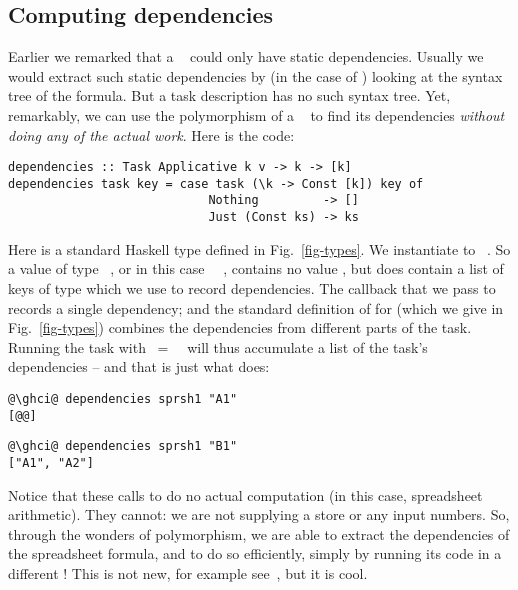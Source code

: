 \subsection{Computing dependencies}\label{sec-deps}

Earlier we remarked that a ~ could only have static
dependencies. Usually we would extract such static dependencies by (in the case
of \Excel) looking at the syntax tree of the formula.  But a task description
has no such syntax tree. Yet, remarkably, we can use the polymorphism of a
~ to find its dependencies \emph{without doing any of
the actual work}. Here is the code:
\vspace{1mm}
\begin{verbatim}
dependencies :: Task Applicative k v -> k -> [k]
dependencies task key = case task (\k -> Const [k]) key of
                            Nothing         -> []
                            Just (Const ks) -> ks
\end{verbatim}
\vspace{1mm}
Here  is a standard Haskell type defined in Fig.~\ref{fig-types}. We
instantiate  to ~\hs{[@@k]}.  So a value of type ~,
or in this case ~\hs{[@@k]}~, contains no value , but does
contain a list of keys of type \hs{[@@k]} which we use to record dependencies.
The  callback that we pass to  records a single dependency;
and the standard definition of  for  (which we give
in Fig.~\ref{fig-types}) combines the dependencies from different parts of the
task. Running the task with ~=~~\hs{[@@k]} will thus
accumulate a list of the task's dependencies -- and that is just what
 does:
\vspace{1mm}
\begin{verbatim}
@\ghci@ dependencies sprsh1 "A1"
[@@]
\end{verbatim}
\begin{verbatim}
@\ghci@ dependencies sprsh1 "B1"
["A1", "A2"]
\end{verbatim}
\vspace{1mm}

\noindent
Notice that these calls to  do no actual computation (in this
case, spreadsheet arithmetic). They cannot: we are not supplying a store or any
input numbers. So, through the wonders of polymorphism, we are able to extract
the dependencies of the spreadsheet formula, and to do so efficiently, simply by
running its code in a different ! This is not new, for example
see~\cite{free-applicatives}, but it is cool.

